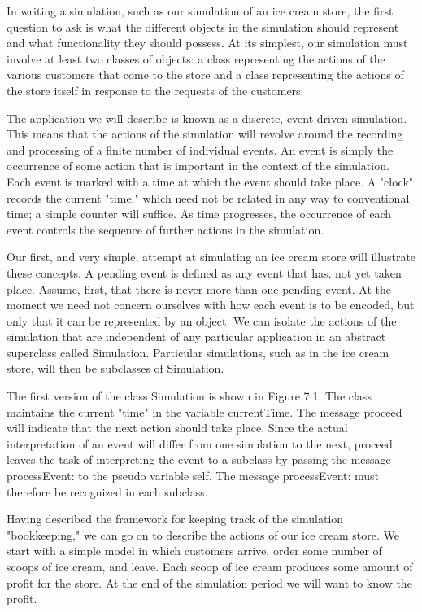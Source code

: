 
In writing a simulation, such as our simulation of an ice cream store, the first
question to ask is what the different objects in the simulation should represent
and what functionality they should possess. At its simplest, our simulation must
involve at least two classes of objects: a class representing the actions of the
various customers that come to the store and a class representing the actions of
the store itself in response to the requests of the customers.

The application we will describe is known as a discrete, event-driven
simulation. This means that the actions of the simulation will revolve around
the recording and processing of a finite number of individual events. An event
is simply the occurrence of some action that is important in the context of the
simulation. Each event is marked with a time at which the event should take
place. A "clock" records the current "time," which need not be related in any
way to conventional time; a simple counter will suffice. As time progresses, the
occurrence of each event controls the sequence of further actions in the
simulation.

Our first, and very simple, attempt at simulating an ice cream store will
illustrate these concepts. A pending event is defined as any event that has. not
yet taken place. Assume, first, that there is never more than one pending event.
At the moment we need not concern ourselves with how each event is to be
encoded, but only that it can be represented by an object. We can isolate the
actions of the simulation that are independent of any particular application in
an abstract superclass called Simulation. Particular simulations, such as in the
ice cream store, will then be subclasses of Simulation.

The first version of the class Simulation is shown in Figure 7.1. The class
maintains the current "time" in the variable currentTime. The message proceed
will indicate that the next action should take place. Since the actual
interpretation of an event will differ from one simulation to the next, proceed
leaves the task of interpreting the event to a subclass by passing the message
processEvent: to the pseudo variable self. The message processEvent: must
therefore be recognized in each subclass.


Having described the framework for keeping track of the simulation
"bookkeeping," we can go on to describe the actions of our ice cream store. We
start with a simple model in which customers arrive, order some number of scoops
of ice cream, and leave. Each scoop of ice cream produces some amount of profit
for the store. At the end of the simulation period we will want to know the
profit.

